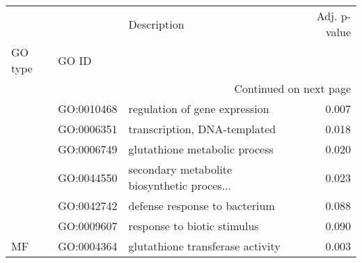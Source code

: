 \begin{longtable}{lllr}
\toprule
   &            &                                  Description &  Adj. p-value \\
GO type & GO ID &                                              &               \\
\midrule
\endhead
\midrule
\multicolumn{4}{r}{{Continued on next page}} \\
\midrule
\endfoot

\bottomrule
\endlastfoot
\multirow{6}{*}{BP} & GO:0010468 &                regulation of gene expression &         0.007 \\
   & GO:0006351 &                 transcription, DNA-templated &         0.018 \\
   & GO:0006749 &                glutathione metabolic process &         0.020 \\
   & GO:0044550 &  secondary metabolite biosynthetic proces... &         0.023 \\
   & GO:0042742 &                defense response to bacterium &         0.088 \\
   & GO:0009607 &                  response to biotic stimulus &         0.090 \\
\cline{1-4}
MF & GO:0004364 &             glutathione transferase activity &         0.003 \\
\end{longtable}
